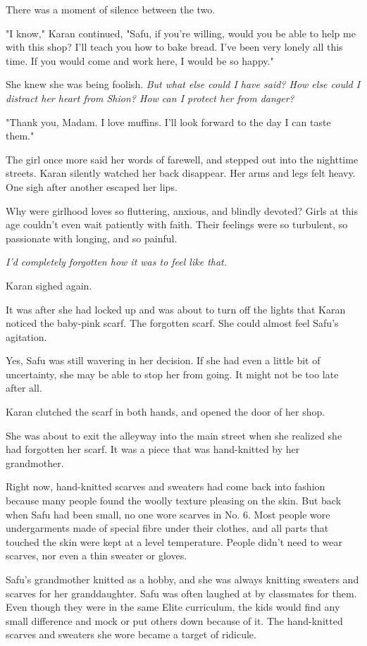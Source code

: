 There was a moment of silence between the two.

"I know," Karan continued, "Safu, if you're willing, would you be able
to help me with this shop? I'll teach you how to bake bread. I've been
very lonely all this time. If you would come and work here, I would be
so happy."

She knew she was being foolish. \emph{But what else could I have said? How
else could I distract her heart from Shion? How can I protect her from
danger?}

"Thank you, Madam. I love muffins. I'll look forward to the day I can
taste them."

The girl once more said her words of farewell, and stepped out into the
nighttime streets. Karan silently watched her back disappear. Her arms
and legs felt heavy. One sigh after another escaped her lips.

Why were girlhood loves so fluttering, anxious, and blindly devoted?
Girls at this age couldn't even wait patiently with faith. Their
feelings were so turbulent, so passionate with longing, and so painful.

\emph{I'd completely forgotten how it was to feel like that.}

Karan sighed again.

It was after she had locked up and was about to turn off the lights that
Karan noticed the baby-pink scarf. The forgotten scarf. She could almost
feel Safu's agitation.

Yes, Safu was still wavering in her decision. If she had even a little
bit of uncertainty, she may be able to stop her from going. It might not
be too late after all.

Karan clutched the scarf in both hands, and opened the door of her shop.

\myspace

She was about to exit the alleyway into the main street when she
realized she had forgotten her scarf. It was a piece that was
hand-knitted by her grandmother.

Right now, hand-knitted scarves and sweaters had come back into fashion
because many people found the woolly texture pleasing on the skin. But
back when Safu had been small, no one wore scarves in No. 6. Most people
wore undergarments made of special fibre under their clothes, and all
parts that touched the skin were kept at a level temperature. People
didn't need to wear scarves, nor even a thin sweater or gloves.

Safu's grandmother knitted as a hobby, and she was always knitting
sweaters and scarves for her granddaughter. Safu was often laughed at by
classmates for them. Even though they were in the same Elite curriculum,
the kids would find any small difference and mock or put others down
because of it. The hand-knitted scarves and sweaters she wore became a
target of ridicule.

